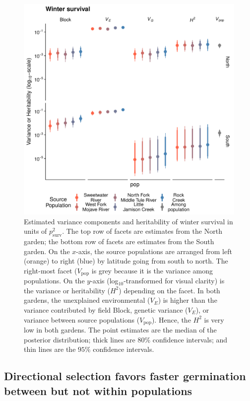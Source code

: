 \documentclass[
  12pt,
]{article}
\begin{document}
\begin{figure}[ht]
  \includegraphics[width=\textwidth]{figures/h2-surv.pdf}
  \caption{Estimated variance components and heritability of winter survival in units of $p^2_\text{surv}$. The top row of facets are estimates from the North garden; the bottom row of facets are estimates from the South garden. On the $x$-axis, the source populations are arranged from left (orange) to right (blue) by latitude going from south to north. The right-most facet ($V_\text{pop}$ is grey because it is the variance among populations. On the $y$-axis (log$_{10}$-transformed for visual clarity) is the variance or heritability ($H^2$) depending on the facet. In both gardens, the unexplained environmental ($V_E$) is higher than the variance contributed by field Block, genetic variance ($V_E$), or variance between source populations ($V_\text{pop}$). Hence, the $H^2$ is very low in both gardens. The point estimates are the median of the posterior distribution; thick lines are $80$\% confidence intervals; and thin lines are the $95$\% confidence intervals.}
  \label{fig:h2-surv}
\end{figure}

\hypertarget{directional-selection-favors-faster-germination-between-but-not-within-populations}{%
\subsection{Directional selection favors faster germination between but not within populations}\label{directional-selection-favors-faster-germination-between-but-not-within-populations}}
\end{document}
